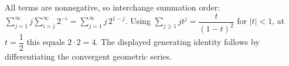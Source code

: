 All terms are nonnegative, so interchange summation order: $\sum_{j=1}^{\infty}j\sum_{i=j}^{\infty}2^{-i}=\sum_{j=1}^{\infty}j\,2^{1-j}$. Using $\sum_{j\ge1}jt^j=\dfrac{t}{(1-t)^2}$ for $|t|<1$, at $t=\dfrac{1}{2}$ this equals $2\cdot2=\boxed4$. The displayed generating identity follows by differentiating the convergent geometric series.
